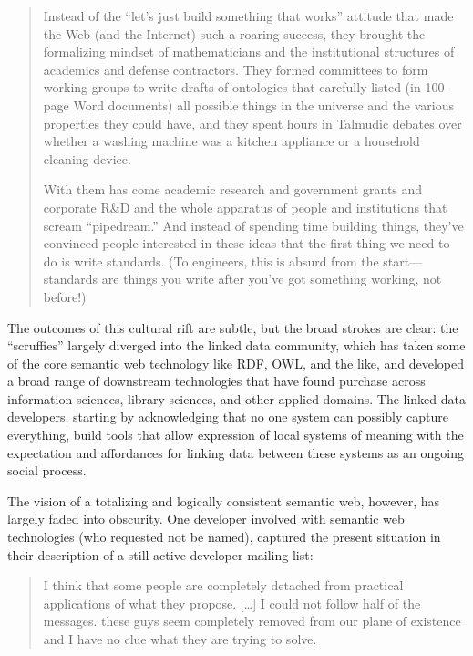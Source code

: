 \begin{quote}
Instead of the ``let's just build something that works'' attitude that
made the Web (and the Internet) such a roaring success, they brought the
formalizing mindset of mathematicians and the institutional structures
of academics and defense contractors. They formed committees to form
working groups to write drafts of ontologies that carefully listed (in
100-page Word documents) all possible things in the universe and the
various properties they could have, and they spent hours in Talmudic
debates over whether a washing machine was a kitchen appliance or a
household cleaning device.

With them has come academic research and government grants and corporate
R\&D and the whole apparatus of people and institutions that scream
``pipedream.'' And instead of spending time building things, they've
convinced people interested in these ideas that the first thing we need
to do is write standards. (To engineers, this is absurd from the
start---standards are things you write after you've got something
working, not before!) \citep{swartzAaronSwartzProgrammable2013} 
\end{quote}

The outcomes of this cultural rift are subtle, but the broad strokes are
clear: the ``scruffies'' largely diverged into the linked data
community, which has taken some of the core semantic web technology like
RDF, OWL, and the like, and developed a broad range of downstream
technologies that have found purchase across information sciences,
library sciences, and other applied domains. The linked data developers, starting
by acknowledging that no one system can possibly capture everything,
build tools that allow expression of local systems of meaning with the
expectation and affordances for linking data between these systems as an
ongoing social process.

The vision of a totalizing and logically consistent semantic web,
however, has largely faded into obscurity. One developer involved with
semantic web technologies (who requested not be named), captured the
present situation in their description of a still-active developer
mailing list:

\begin{quote}
I think that some people are completely detached from practical
applications of what they propose. {[}\ldots{]} I could not follow half
of the messages. these guys seem completely removed from our plane of
existence and I have no clue what they are trying to solve.
\end{quote}

